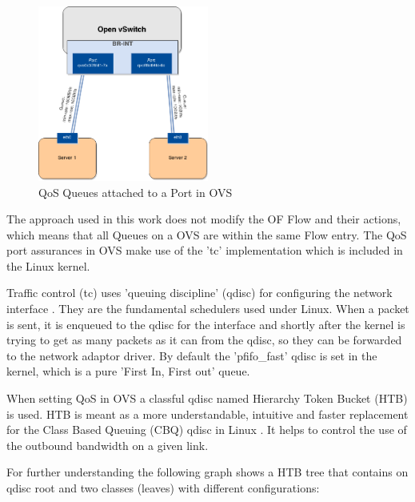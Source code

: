\begin{figure}[H]
\centering
\includegraphics[width=0.5\textwidth]{images/fundamentals/openvswitch_qos-queues.png}
\caption{QoS Queues attached to a Port in OVS}
\end{figure}

The approach used in this work does not modify the OF Flow and their actions, which means that all Queues on a OVS are within the same Flow entry. The QoS port assurances in OVS make use of the 'tc' implementation which is included in the Linux kernel.



Traffic control (tc) uses 'queuing discipline' (qdisc) for configuring the network interface \cite{tc-manual}. They are the fundamental schedulers used under Linux. When a packet is sent, it is enqueued to the qdisc for the interface and shortly after the kernel is trying to get as many packets as it can from the qdisc, so they can be forwarded to the network adaptor driver. By default the 'pfifo\_fast' qdisc is set in the kernel, which is a pure 'First In, First out' queue.

When setting QoS in OVS a classful qdisc named Hierarchy Token Bucket (HTB) is used. HTB is meant as a more understandable, intuitive and faster replacement for the Class Based Queuing (CBQ) qdisc in Linux \cite{htb-guide}. It helps to control the use of the outbound bandwidth on a given link. 

For further understanding the following graph shows a HTB tree that contains on qdisc root and two classes (leaves) with different configurations:

